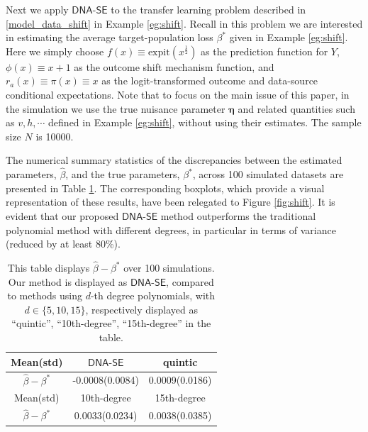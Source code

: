 \documentclass{article}
\def\dnase{{\mathsf{DNA\mbox{-}SE}}}
\def\expit{\mathrm{expit}}
\theoremstyle{plain}
\theoremstyle{definition}
\theoremstyle{remark}
\def\hat{\widehat}
\begin{document}
Next we apply $\dnase$ to the transfer learning problem described in \eqref{model_data_shift} in Example \ref{eg:shift}. Recall in this problem we are interested in estimating the average target-population loss $\beta^{\ast}$ given in Example \ref{eg:shift}. Here we simply choose $f (x) \equiv \expit (x^{\frac{1}{2}})$ as the prediction function for $Y$, $\phi (x) \equiv x + 1$ as the outcome shift mechanism function, and $r_{a} (x) \equiv \pi (x) \equiv x$ as the logit-transformed outcome and data-source conditional expectations. Note that to focus on the main issue of this paper, in the simulation we use the true nuisance parameter $\bm{\eta}$ and related quantities such as $v, h, \cdots$ defined in Example \ref{eg:shift}, without using their estimates. The sample size $N$ is 10000.

The numerical summary statistics of the discrepancies between the estimated parameters, $\hat{\beta}$, and the true parameters, $\beta^\ast$, across 100 simulated datasets are presented in Table \ref{table:simu_3}. The corresponding boxplots, which provide a visual representation of these results, have been relegated to Figure \ref{fig:shift}. It is evident that our proposed $\dnase$ method outperforms the traditional polynomial method with different degrees, in particular in terms of variance (reduced by at least 80\%).
\vskip -0.1in
\begin{table}[htbp]
\caption{This table displays $\hat{\beta} - \beta^\ast$ over 100 simulations. Our method is displayed as $\dnase$, compared to methods using $d$-th degree polynomials, with $d \in \{5, 10, 15\}$, respectively displayed as ``quintic'', ``10th-degree'', ``15th-degree'' in the table.}
\label{table:simu_3}
\begin{center}
\begin{small}
\begin{sc}
\vskip 0.1in
\begin{tabular}{ccc}
\toprule
Mean(std)    & $\dnase$  &   quintic  \\
\midrule
$\hat{\beta} - \beta^*$ & -0.0008(0.0084) & 0.0009(0.0186)  \\ 
\toprule
Mean(std)    & 10th-degree &  15th-degree \\
\midrule
$\hat{\beta} - \beta^\ast$ &  0.0033(0.0234) & 0.0038(0.0385)  \\
\bottomrule
\end{tabular}
\end{sc}
\end{small}
\end{center}
\end{table}
\end{document}
